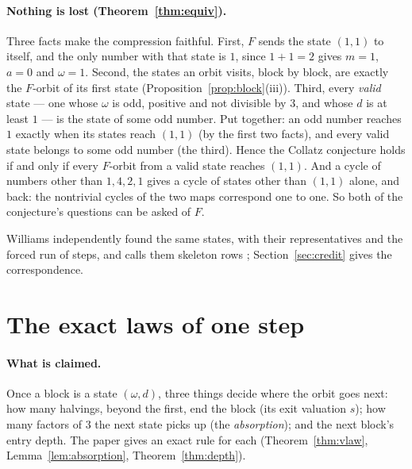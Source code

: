 \documentclass[11pt]{article}
\theoremstyle{remark}
\newcommand{\w}{\omega}
\begin{document}
\paragraph{Nothing is lost (Theorem~\ref{thm:equiv}).} Three facts make the compression faithful. First, $F$ sends the state $(1,1)$ to itself, and the only number with that state is $1$, since $1 + 1 = 2$ gives $m = 1$, $a = 0$ and $\w = 1$. Second, the states an orbit visits, block by block, are exactly the $F$-orbit of its first state (Proposition~\ref{prop:block}(iii)). Third, every \emph{valid} state --- one whose $\w$ is odd, positive and not divisible by $3$, and whose $d$ is at least $1$ --- is the state of some odd number. Put together: an odd number reaches $1$ exactly when its states reach $(1,1)$ (by the first two facts), and every valid state belongs to some odd number (the third). Hence the Collatz conjecture holds if and only if every $F$-orbit from a valid state reaches $(1,1)$. And a cycle of numbers other than $1, 4, 2, 1$ gives a cycle of states other than $(1,1)$ alone, and back: the nontrivial cycles of the two maps correspond one to one. So both of the conjecture's questions can be asked of $F$.

Williams independently found the same states, with their representatives and the forced run of steps, and calls them skeleton rows \cite{williams}; Section~\ref{sec:credit} gives the correspondence.

\section{The exact laws of one step}\label{sec:anchor}

\paragraph{What is claimed.} Once a block is a state $(\w,d)$, three things decide where the orbit goes next: how many halvings, beyond the first, end the block (its exit valuation $s$); how many factors of $3$ the next state picks up (the \emph{absorption}); and the next block's entry depth. The paper gives an exact rule for each (Theorem~\ref{thm:vlaw}, Lemma~\ref{lem:absorption}, Theorem~\ref{thm:depth}).
\end{document}
